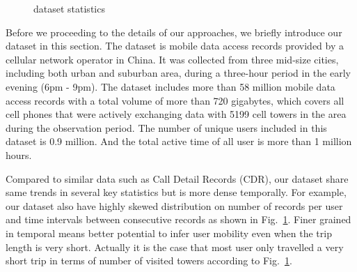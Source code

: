 \begin{figure}[ht]
  \centering
  \caption{dataset statistics}
	\label{fig:data_stat}
\end{figure}

Before we proceeding to the details of our approaches, we briefly introduce our dataset in this section. The dataset is mobile data access records provided by a cellular network operator in China. It was collected from three mid-size cities, including both urban and suburban area, during a three-hour period in the early evening (6pm - 9pm). The dataset includes more than 58 million mobile data access records with a total volume of more than 720 gigabytes, which covers all cell phones that were actively exchanging data with 5199 cell towers in the area during the observation period. The number of unique users included in this dataset is 0.9 million. And the total active time of all user is more than 1 million hours. 

Compared to similar data such as Call Detail Records (CDR), our dataset share same trends in several key statistics but is more dense temporally. For example, our dataset also have highly skewed distribution on number of records per user and time intervals between consecutive records as shown in Fig.~\ref{fig:data_stat}. Finer grained in temporal means better potential to infer user mobility even when the trip length is very short. Actually it is the case that most user only travelled a very short trip in terms of number of visited towers according to Fig.~\ref{fig:data_stat}.

